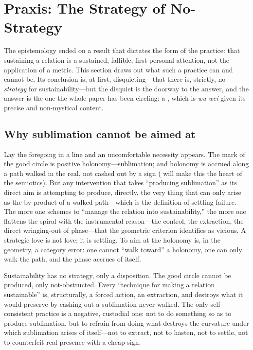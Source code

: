 \section{Praxis: The Strategy of No-Strategy}
\label{p09:sec:praxis}

\noindent
The epistemology ended on a result that dictates the form of the practice: that sustaining a relation is a sustained, fallible, first-personal attention, not the application of a metric. This section draws out what such a practice can and cannot be. Its conclusion is, at first, disquieting---that there is, strictly, no \emph{strategy} for sustainability---but the disquiet is the doorway to the answer, and the answer is the one the whole paper has been circling: a , which is \emph{wu wei} given its precise and non-mystical content.

\subsection{Why sublimation cannot be aimed at}
\label{p09:sec:no-aim}

Lay the foregoing in a line and an uncomfortable necessity appears. The mark of the good circle is positive holonomy---sublimation; and holonomy is accrued along a path walked in the real, not cashed out by a sign ( will make this the heart of the semiotics). But any intervention that takes ``producing sublimation'' as its direct aim is attempting to produce, directly, the very thing that can only arise as the by-product of a walked path---which is the definition of settling failure.  The more one schemes to ``manage the relation into sustainability,'' the more one flattens the spiral with the instrumental reason---the control, the extraction, the direct wringing-out of phase---that the geometric criterion identifies as vicious. A strategic love is not love; it is settling. To aim at the holonomy is, in the geometry, a category error: one cannot ``walk toward'' a holonomy, one can only walk the path, and the phase accrues of itself.

\begin{claim}
Sustainability has no strategy, only a disposition. The good circle cannot be produced, only not-obstructed. Every ``technique for making a relation sustainable'' is, structurally, a forced action, an extraction, and destroys what it would preserve by cashing out a sublimation never walked. The only self-consistent practice is a negative, custodial one: not to do something so as to produce sublimation, but to refrain from doing what destroys the curvature under which sublimation arises of itself---not to extract, not to hasten, not to settle, not to counterfeit real presence with a cheap sign. 
\end{claim}


